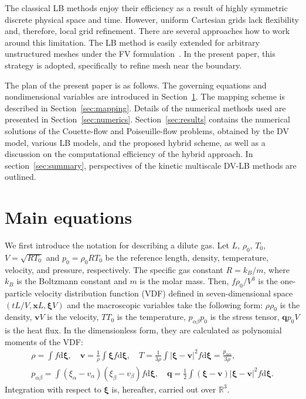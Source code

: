 \documentclass{elsarticle} %
\newcommand{\dd}{\mathrm{d}}
\newcommand{\dxi}{\dd{\boldsymbol{\xi}}}
\newcommand{\bxi}{\boldsymbol{\xi}}
\newcommand{\bv}{\boldsymbol{v}}
\newcommand{\bq}{\boldsymbol{q}}
\newcommand{\bx}{\boldsymbol{x}}
\newcommand{\refer}[1]{#1_0}
\begin{document}
The classical LB methods enjoy their efficiency as a result of highly symmetric discrete physical space and time.
However, uniform Cartesian grids lack flexibility and, therefore, local grid refinement.
There are several approaches how to work around this limitation.
The LB method is easily extended for arbitrary unstructured meshes
under the FV formulation~\cite{Succi1992, Peng1999, Patil2009, Li2016}.
In the present paper, this strategy is adopted, specifically to refine mesh near the boundary.

The plan of the present paper is as follows.
The governing equations and nondimensional variables are introduced in Section~\ref{sec:equations}.
The mapping scheme is described in Section~\ref{sec:mapping}.
Details of the numerical methods used are presented in Section~\ref{sec:numerics}.
Section~\ref{sec:results} contains the numerical solutions of the Couette-flow and Poiseuille-flow problems,
obtained by the DV model, various LB models, and the proposed hybrid scheme,
as well as a discussion on the computational efficiency of the hybrid approach.
In section~\ref{sec:summary}, perspectives of the kinetic multiscale DV-LB methods are outlined.

\section{Main equations}\label{sec:equations}

We first introduce the notation for describing a dilute gas.
Let \(L\), \(\refer\rho\), \(\refer{T}\), \(V = \sqrt{R\refer{T}}\) and \(\refer{p} = \refer{\rho}R\refer{T}\) be
the reference length, density, temperature, velocity, and pressure, respectively.
The specific gas constant \(R = k_B/m\), where \(k_B\) is the Boltzmann constant and \(m\) is the molar mass.
Then, \(f\refer{\rho}/V^3\) is the one-particle velocity distribution function (VDF)
defined in seven-dimensional space \((tL/V, \bx L, \bxi V)\) and
the macroscopic variables take the following form:
\(\rho\refer{\rho}\) is the density, \(\bv V\) is the velocity, \(T\refer{T}\) is the temperature,
\(p_{\alpha\beta}\refer{p}\) is the stress tensor, \(\bq\refer{p}V\) is the heat flux.
In the dimensionless form, they are calculated as polynomial moments of the VDF:
\begin{equation}\label{eq:macro}
    \begin{gathered}
    \rho = \int f \dxi, \quad
    \bv = \frac1{\rho} \int \bxi f \dxi, \quad
    T = \frac{1}{3\rho}\int|\bxi-\bv|^2f \dxi = \frac{p_{\alpha\alpha}}{3\rho}, \\
    p_{\alpha\beta} = \int(\xi_{\alpha}-v_{\alpha})(\xi_{\beta}-v_{\beta}) f \dxi, \quad
    \bq = \frac12\int(\bxi-\bv)|\bxi-\bv|^2 f \dxi.
    \end{gathered}
\end{equation}
Integration with respect to \(\bxi\) is, hereafter, carried out over \(\mathbb{R}^3\).
\end{document}
